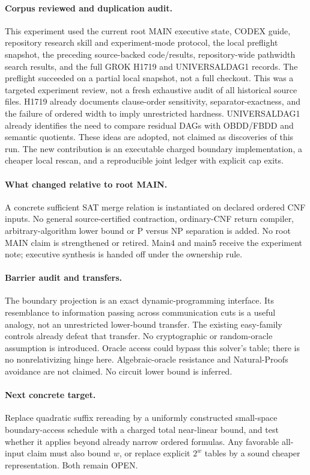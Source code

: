\documentclass[11pt]{article}
\begin{document}
\paragraph{Corpus reviewed and duplication audit.}
This experiment used the current root MAIN executive state, CODEX guide,
repository research skill and experiment-mode protocol, the local preflight
snapshot, the preceding source-backed code/results, repository-wide pathwidth
search results, and the full GROK H1719 and UNIVERSALDAG1 records.
The preflight succeeded on a partial local snapshot, not a full checkout.
This was a targeted experiment review, not a fresh exhaustive audit of all
historical source files. H1719 already documents clause-order sensitivity,
separator-exactness, and the failure of ordered width to imply unrestricted
hardness. UNIVERSALDAG1 already identifies the need to compare residual DAGs
with OBDD/FBDD and semantic quotients. These ideas are adopted, not claimed
as discoveries of this run. The new contribution is an executable charged
boundary implementation, a cheaper local rescan, and a reproducible joint
ledger with explicit cap exits.

\paragraph{What changed relative to root MAIN.}
A concrete sufficient SAT merge relation is instantiated on declared ordered
CNF inputs. No general source-certified contraction, ordinary-CNF return
compiler, arbitrary-algorithm lower bound or P versus NP separation is added.
No root MAIN claim is strengthened or retired. Main4 and main5 receive the
experiment note; executive synthesis is handed off under the ownership rule.

\paragraph{Barrier audit and transfers.}
The boundary projection is an exact dynamic-programming interface. Its
resemblance to information passing across communication cuts is a useful
analogy, not an unrestricted lower-bound transfer. The existing easy-family
controls already defeat that transfer. No cryptographic or random-oracle
assumption is introduced. Oracle access could bypass this solver's table;
there is no nonrelativizing hinge here. Algebraic-oracle resistance and
Natural-Proofs avoidance are not claimed. No circuit lower bound is inferred.

\paragraph{Next concrete target.}
Replace quadratic suffix rereading by a uniformly constructed small-space
boundary-access schedule with a charged total near-linear bound, and test
whether it applies beyond already narrow ordered formulas. Any favorable
all-input claim must also bound $w$, or replace explicit $2^w$ tables by a
sound cheaper representation. Both remain OPEN.



\end{document}
